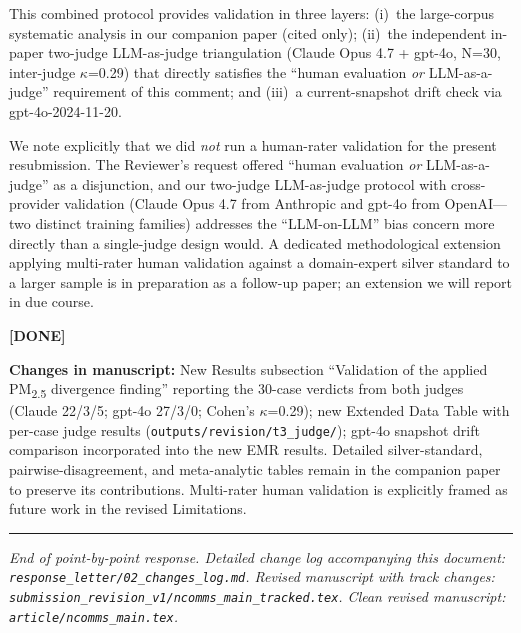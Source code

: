 \documentclass[11pt,a4paper]{article}
\newcommand{\changes}[1]{\par\noindent\textbf{\color{revblue}Changes in manuscript:} #1\par}
\newcommand{\done}{\color{revgreen}\textbf{[DONE]}}
\begin{document}
{This combined protocol provides validation in three layers: (i)~the large-corpus systematic analysis in our companion paper (cited only); (ii)~the independent in-paper two-judge LLM-as-judge triangulation (Claude Opus 4.7 + gpt-4o, N=30, inter-judge $\kappa$=0.29) that directly satisfies the ``human evaluation \emph{or} LLM-as-a-judge'' requirement of this comment; and (iii)~a current-snapshot drift check via gpt-4o-2024-11-20.

We note explicitly that we did \emph{not} run a human-rater validation for the present resubmission. The Reviewer's request offered ``human evaluation \emph{or} LLM-as-a-judge'' as a disjunction, and our two-judge LLM-as-judge protocol with cross-provider validation (Claude Opus 4.7 from Anthropic and gpt-4o from OpenAI---two distinct training families) addresses the ``LLM-on-LLM'' bias concern more directly than a single-judge design would. A dedicated methodological extension applying multi-rater human validation against a domain-expert silver standard to a larger sample is in preparation as a follow-up paper; an extension we will report in due course.} \done

\changes{New Results subsection ``Validation of the applied PM\textsubscript{2.5} divergence finding'' reporting the 30-case verdicts from both judges (Claude 22/3/5; gpt-4o 27/3/0; Cohen's $\kappa$=0.29); new Extended Data Table with per-case judge results (\texttt{outputs/revision/t3\_judge/}); gpt-4o snapshot drift comparison incorporated into the new EMR results. Detailed silver-standard, pairwise-disagreement, and meta-analytic tables remain in the companion paper to preserve its contributions. Multi-rater human validation is explicitly framed as future work in the revised Limitations.}

\bigskip\bigskip
\hrule
\bigskip

\noindent\emph{End of point-by-point response. Detailed change log accompanying this document: \texttt{response\_letter/02\_changes\_log.md}. Revised manuscript with track changes: \texttt{submission\_revision\_v1/ncomms\_main\_tracked.tex}. Clean revised manuscript: \texttt{article/ncomms\_main.tex}.}
\end{document}
